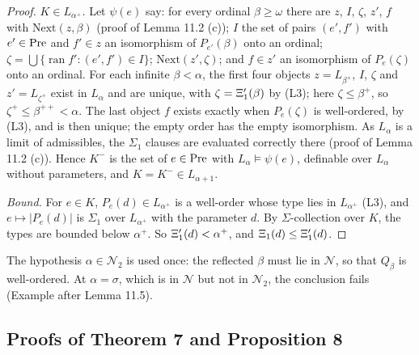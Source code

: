 \documentclass[11pt]{article}
\begin{document}
\begin{proof}
\emph{$K \in L_{\alpha^+}$.} Let $\psi(e)$ say: for every ordinal $\beta \ge \omega$ there are $z$, $I$, $\zeta$,
$z'$, $f$ with $\mathrm{Next}(z, \beta)$ (proof of Lemma 11.2 (c)); $I$ the set of pairs $(e', f')$ with
$e' \in \mathrm{Pre}$ and $f' \in z$ an isomorphism of $P_{e'}(\beta)$ onto an ordinal;
$\zeta = \bigcup \{\operatorname{ran} f' : (e', f') \in I\}$; $\mathrm{Next}(z', \zeta)$; and $f \in z'$ an
isomorphism of $P_e(\zeta)$ onto an ordinal. For each infinite $\beta < \alpha$, the first four objects
$z = L_{\beta^+}$, $I$, $\zeta$ and $z' = L_{\zeta^+}$ exist in $L_{\alpha}$ and are unique, with $\zeta = \Xi'_1(\beta)$
by (L3); here $\zeta \le \beta^+$, so $\zeta^+ \le \beta^{++} < \alpha$. The last object $f$ exists exactly when
$P_e(\zeta)$ is well-ordered, by (L3), and is then unique; the empty order has the empty isomorphism. As $L_{\alpha}$
is a limit of admissibles, the $\Sigma_1$ clauses are evaluated correctly there (proof of Lemma 11.2 (c)). Hence
$K^-$ is the set of $e \in \mathrm{Pre}$ with $L_{\alpha} \models \psi(e)$, definable over $L_{\alpha}$ without parameters,
and $K = K^- \in L_{\alpha + 1}$.

\emph{Bound.} For $e \in K$, $P_e(d) \in L_{\alpha^+}$ is a well-order whose type lies in $L_{\alpha^+}$ (L3), and
$e \mapsto |P_e(d)|$ is $\Sigma_1$ over $L_{\alpha^+}$ with the parameter $d$. By $\Sigma$-collection over $K$, the
types are bounded below $\alpha^+$. So $\Xi'_1(d) < \alpha^+$, and $\Xi_1(d) \le \Xi'_1(d)$.
\end{proof}

The hypothesis $\alpha \in \mathcal N_2$ is used once: the reflected $\beta$ must lie in $\mathcal N$, so that
$Q_{\beta}$ is well-ordered. At $\alpha = \sigma$, which is in $\mathcal N$ but not in $\mathcal N_2$, the conclusion
fails (Example after Lemma 11.5).

\subsection{Proofs of Theorem 7 and Proposition 8}
\end{document}
